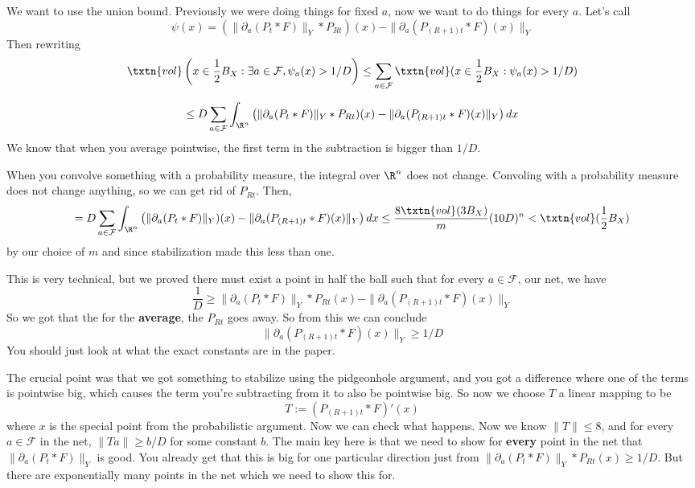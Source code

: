 We want to use the union bound. Previously we were doing things for fixed $a$, now we want to do things for every $a$. Let's call
\[
\psi(x) = \left(\|\partial_a(P_t*F)\|_Y * P_{Rt}\right)(x) - \|\partial_a\left(P_{(R + 1)t}*F\right)(x)\|_Y 
\]
Then rewriting
\[
\txtn{vol}\left(x \in \frac{1}{2}B_X: \exists a \in \mathcal{F}, \psi_a(x) > 1/D\right) \leq \sum_{a \in \mathcal{F}} \txtn{vol}(x \in \frac{1}{2}B_X: \psi_a(x) > 1/D)
\]

\[
\leq D\sum_{a \in \mathcal{F}} \int_{\R^n}\left(\|\partial_a(P_t*F)\|_Y * P_{Rt})(x) - \|\partial_a(P_{(R + 1)t} * F)(x)\|_Y\right) dx
\]
We know that when you average pointwise, the first term in the subtraction is bigger than $1/D$. 

When you convolve something with a probability measure, the integral over $\R^n$ does not change. Convoling with a probability measure does not change anything, so we can get rid of $P_{Rt}$. Then, 
\[
= D\sum_{a \in \mathcal{F}} \int_{\R^n}\left(\|\partial_a(P_t*F)\|_Y)(x) - \|\partial_a(P_{(R + 1)t} * F)(x)\|_Y\right) dx \leq \frac{8\txtn{vol}(3B_X)}{m}(10D)^n < \txtn{vol}(\frac{1}{2}B_X)
\]
by our choice of $m$ and since stabilization made this less than one. 

This is very technical, but we proved there must exist a point in half the ball such that for every $a \in \mathcal{F}$, our net, we have
\[
\frac{1}{D} \geq \|\partial_a(P_t *F)\|_{Y} * P_{Rt}(x) - \|\partial_a(P_{(R + 1)t}*F)(x)\|_Y
\]
So we got that the for the \textbf{average}, the $P_{Rt}$ goes away. So from this we can conclude 
\[
\|\partial_a(P_{(R + 1)t} * F)(x)\|_Y \ge 1/D
\]
You should just look at what the exact constants are in the paper. 

The crucial point was that we got something to stabilize using the pidgeonhole argument, and you got a difference where one of the terms is pointwise big, which causes the term you're subtracting from it to also be pointwise big. So now we choose $T$ a linear mapping to be
\[
T := (P_{(R + 1)t} * F)'(x)
\]
where $x$ is the special point from the probabilistic argument. Now we can check what happens. Now we know $\|T\| \leq 8$, and for every $a \in \mathcal{F}$ in the net, $\|Ta\| \ge b/D$ for some constant $b$. 
The main key here is that we need to show for \textbf{every} point in the net that $\|\partial_a (P_t * F)\|_Y$ is good. You already get that this is big for one particular direction just from $\|\partial_a (P_t * F)\|_Y * P_{Rt}(x) \ge 1/D$. But there are exponentially many points in the net which we need to show this for. 

